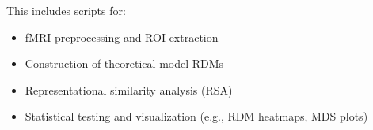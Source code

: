 \documentclass{article}
\begin{document}
This includes scripts for:
\begin{itemize}
    \item fMRI preprocessing and ROI extraction
    \item Construction of theoretical model RDMs
    \item Representational similarity analysis (RSA)
    \item Statistical testing and visualization (e.g., RDM heatmaps, MDS plots)
\end{itemize}
    



   
\end{document}
